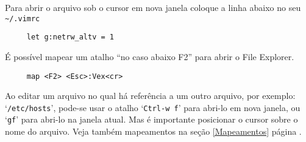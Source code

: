 Para abrir o arquivo sob o cursor em nova janela coloque a linha abaixo no seu \verb|~/.vimrc|

\begin{verbatim}
     let g:netrw_altv = 1
\end{verbatim}

É possível mapear um atalho ``no caso abaixo F2'' para abrir o File Explorer.

\begin{verbatim}
     map <F2> <Esc>:Vex<cr>
\end{verbatim}


{\Large {}} Ao editar um arquivo no qual há referência a um outro
arquivo, por exemplo: `{\tt /etc/hosts}', pode-se usar o atalho `{\tt Ctrl-w
f}' para abri-lo em nova janela, ou `{\tt gf}' para abri-lo na janela atual.
Mas é importante posicionar o cursor sobre o nome do arquivo.  Veja também
mapeamentos na seção \ref{Mapeamentos} página \pageref{Mapeamentos}.
